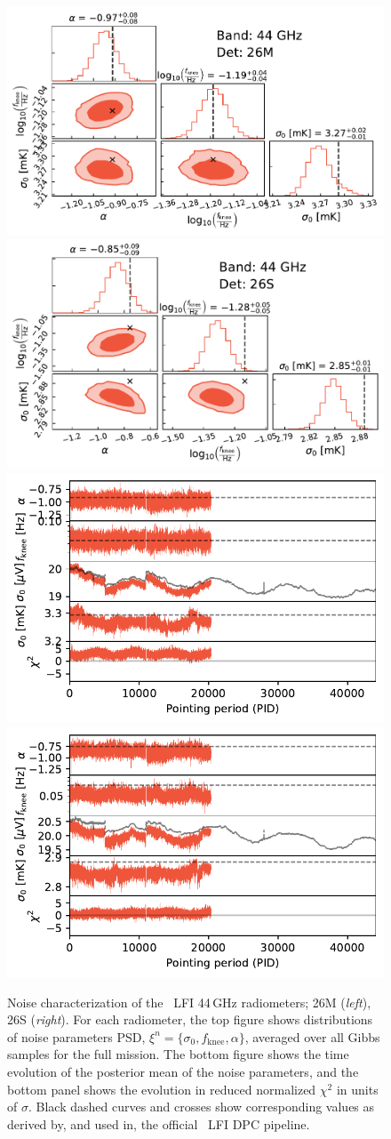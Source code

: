 \documentclass[twocolumn]{aa}
\begin{document}
\begin{figure}[t]
	\begin{center}
		\includegraphics[width=0.495\linewidth]{figs/corner_band_044_det_5_mean.pdf}
		\includegraphics[width=0.495\linewidth]{figs/corner_band_044_det_6_mean.pdf}\\
		\includegraphics[width=0.495\linewidth]{figs/xi_vs_pid_band_044_det_5_mean.pdf}
		\includegraphics[width=0.495\linewidth]{figs/xi_vs_pid_band_044_det_6_mean.pdf}\\    
		\vspace*{-4.5mm} 
	\end{center}
	
	\caption{Noise characterization of the \Planck\ LFI 44\,GHz
		radiometers; 26M (\emph{left}), 26S (\emph{right}). For each
		radiometer, the top figure shows distributions of noise parameters
		PSD, $\xi^n = \{\sigma_0, f_\mathrm{knee}, \alpha\}$, averaged
		over all Gibbs samples for the full mission. The bottom figure
		shows the time evolution of the posterior mean of the noise
		parameters, and the bottom panel shows the evolution in reduced
		normalized $\chi^2$ in units of $\sigma$. Black dashed curves and crosses show corresponding values as derived by, and used in, the
		official \Planck\ LFI DPC pipeline.
		\label{fig:xi_prop_44_2}}
\end{figure}
\end{document}
